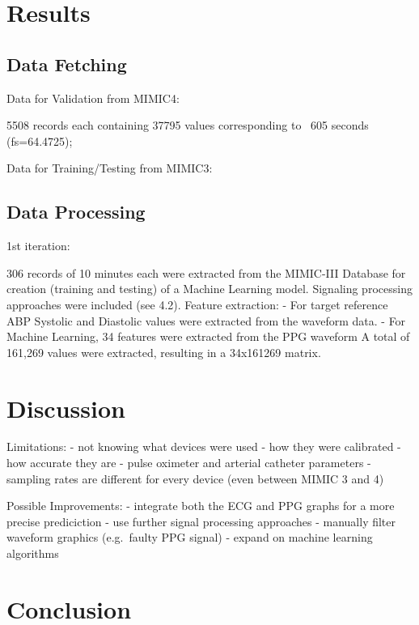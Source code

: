 \documentclass[12pt, bibliography=totoc]{scrartcl}
\begin{document}
\section{Results}
\label{sec:results}

\subsection{Data Fetching}
\label{subsec:data_fetching}

Data for Validation from MIMIC4:

5508 records each containing 37795 values corresponding to ~605 seconds (fs=64.4725);

Data for Training/Testing from MIMIC3:

\subsection{Data Processing}
\label{subsec:data_processing}

1st iteration:

306 records of 10 minutes each were extracted from the MIMIC-III Database for creation (training and testing) of a Machine Learning model.
Signaling processing approaches were included (see 4.2).
Feature extraction:
- For target reference ABP Systolic and Diastolic values were extracted from the waveform data.
- For Machine Learning, 34 features were extracted from the PPG waveform
A total of 161,269 values were extracted, resulting in a 34x161269 matrix.


\section{Discussion}
\label{sec:discussion}

Limitations:
- not knowing what devices were used
- how they were calibrated
- how accurate they are
- pulse oximeter and arterial catheter parameters
- sampling rates are different for every device (even between MIMIC 3 and 4)

Possible Improvements:
- integrate both the ECG and PPG graphs for a more precise prediciction
- use further signal processing approaches
- manually filter waveform graphics (e.g.\ faulty PPG signal)
- expand on machine learning algorithms

\section{Conclusion}
\label{sec:conclusion}



\end{document}
